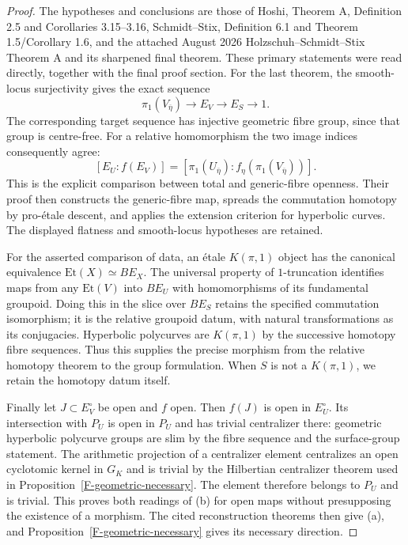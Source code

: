 \begin{proof}
The hypotheses and conclusions are those of Hoshi, Theorem A,
Definition 2.5 and Corollaries 3.15--3.16\cite{F-HoshiPoly},
Schmidt--Stix, Definition 6.1 and Theorem 1.5/Corollary
1.6\cite{F-SchmidtStix}, and the attached August 2026
Holzschuh--Schmidt--Stix Theorem A and its sharpened final
theorem\cite{F-HolzschuhSchmidtStix}. These primary statements
were read directly, together with the final proof section.
For the last theorem, the smooth-locus surjectivity gives
the exact sequence
\[
 \pi_1(V_{\overline\eta})\longrightarrow E_V
     \longrightarrow E_S\longrightarrow1.
\]
The corresponding target sequence has injective geometric
fibre group, since that group is centre-free. For a relative
homomorphism the two image indices consequently agree:
\[
 [E_U:f(E_V)]
 = [\pi_1(U_{\overline\eta}):
                f_\eta(\pi_1(V_{\overline\eta}))].
\]
This is the explicit comparison between total and generic-fibre
openness. Their proof then constructs the generic-fibre map,
spreads the commutation homotopy by pro-\'etale descent, and
applies the extension criterion for hyperbolic curves. The
displayed flatness and smooth-locus hypotheses are retained.

For the asserted comparison of data, an \'etale $K(\pi,1)$
object has the canonical equivalence
$\mathrm{Et}(X)\simeq B E_X$. The universal property of
$1$-truncation identifies maps from any $\mathrm{Et}(V)$ into
$B E_U$ with homomorphisms of its fundamental groupoid. Doing
this in the slice over $B E_S$ retains the specified
commutation isomorphism; it is the relative groupoid datum,
with natural transformations as its conjugacies. Hyperbolic
polycurves are $K(\pi,1)$ by the successive homotopy fibre
sequences. Thus this supplies the precise morphism from the
relative homotopy theorem to the group formulation. When $S$
is not a $K(\pi,1)$, we retain the homotopy datum itself.

Finally let $J\subset E_V^\circ$ be open and $f$ open.
Then $f(J)$ is open in $E_U^\circ$. Its intersection with
$P_U$ is open in $P_U$ and has trivial centralizer there:
geometric hyperbolic polycurve groups are slim by the fibre
sequence and the surface-group statement. The arithmetic
projection of a centralizer element centralizes an open
cyclotomic kernel in $G_K$ and is trivial by the Hilbertian
centralizer theorem used in Proposition~\ref{F-geometric-necessary}.
The element therefore belongs to $P_U$ and is trivial. This
proves both readings of (b) for open maps without presupposing
the existence of a morphism. The cited reconstruction theorems
then give (a), and Proposition~\ref{F-geometric-necessary}
gives its necessary direction.
\end{proof}

